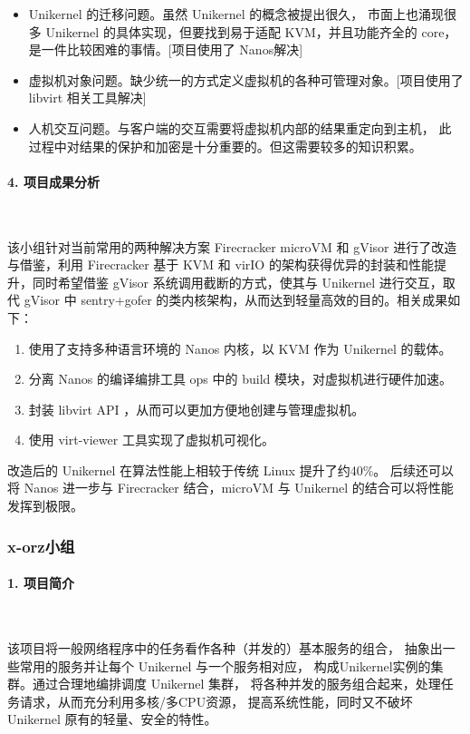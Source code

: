 \documentclass[UTF8,fontset=none,linespread=1.15]{ctexart}
\begin{document}
\begin{itemize}
\item Unikernel 的迁移问题。虽然 Unikernel 的概念被提出很久，
市面上也涌现很多 Unikernel 的具体实现，但要找到易于适配 KVM，并且功能齐全的
 core，是一件比较困难的事情。[项目使用了 Nanos解决]
\item 虚拟机对象问题。缺少统一的方式定义虚拟机的各种可管理对象。[项目使用了 libvirt 相关工具解决]
\item 人机交互问题。与客户端的交互需要将虚拟机内部的结果重定向到主机，
此过程中对结果的保护和加密是十分重要的。但这需要较多的知识积累。
\end{itemize}

\paragraph{4. 项目成果分析}~\par

该小组针对当前常用的两种解决方案 Firecracker microVM 和
 gVisor 进行了改造与借鉴，利用 Firecracker 基于 KVM 和
 virIO 的架构获得优异的封装和性能提升，同时希望借鉴 gVisor
 系统调用截断的方式，使其与 Unikernel 进行交互，取代 gVisor
 中 sentry+gofer 的类内核架构，从而达到轻量高效的目的。相关成果如下：

\begin{enumerate}
\item 使用了支持多种语言环境的 Nanos 内核，以 KVM 作为 Unikernel 的载体。
\item 分离 Nanos 的编译编排工具 ops 中的 build 模块，对虚拟机进行硬件加速。
\item 封装 libvirt API ，从而可以更加方便地创建与管理虚拟机。
\item 使用 virt-viewer 工具实现了虚拟机可视化。
\end{enumerate}

改造后的 Unikernel 在算法性能上相较于传统 Linux 提升了约40\%。
后续还可以将 Nanos 进一步与 Firecracker 结合，microVM 与
 Unikernel 的结合可以将性能发挥到极限。

\subsubsection{x-orz小组}

\paragraph{1. 项目简介}~\par

该项目将一般网络程序中的任务看作各种（并发的）基本服务的组合，
抽象出一些常用的服务并让每个 Unikernel 与一个服务相对应，
构成Unikernel实例的集群。通过合理地编排调度 Unikernel 集群，
将各种并发的服务组合起来，处理任务请求，从而充分利用多核/多CPU资源，
提高系统性能，同时又不破坏 Unikernel 原有的轻量、安全的特性。
\end{document}
